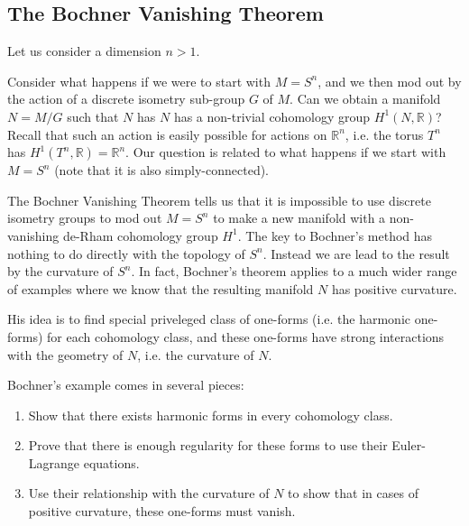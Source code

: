 \subsection{The Bochner Vanishing Theorem}

Let us consider a dimension \(n > 1\).

Consider what happens if we were to start with \(M = S^n\), and we then mod out by the action of a
discrete isometry sub-group \(G\) of \(M\). Can we obtain a manifold \(N = M / G\) such that \(N\)
has \(N\) has a non-trivial cohomology group \(H^1(N, \mathbb R)\)? Recall that such an action is easily 
possible for actions on \(\mathbb R^n\), i.e. the torus \(T^n\) has \(H^1(T^n, \mathbb R) = \mathbb R^n\).
Our question is related to what happens if we start with \(M = S^n\) (note that it is also simply-connected).

The Bochner Vanishing Theorem tells us that it is impossible to use discrete isometry groups to mod out \(M = S^n\)
to make a new manifold with a non-vanishing de-Rham cohomology group \(H^1\). The key to Bochner's method
has nothing to do directly with the topology of \(S^n\). Instead we are lead to the result by the 
curvature of \(S^n\). In fact, Bochner's theorem applies to a much wider range of examples where we know
that the resulting manifold \(N\) has positive curvature. 

His idea is to find special priveleged class of one-forms (i.e. the harmonic one-forms) for each cohomology class,
and these one-forms have strong interactions with the geometry of \(N\), i.e. the curvature of \(N\). 

Bochner's example comes in several pieces:
\begin{enumerate}
\item Show that there exists harmonic forms in every cohomology class.
\item Prove that there is enough regularity for these forms to use their Euler-Lagrange equations.
\item Use their relationship with the curvature of \(N\) to show that in cases of positive curvature,
these one-forms must vanish. 
\end{enumerate}
